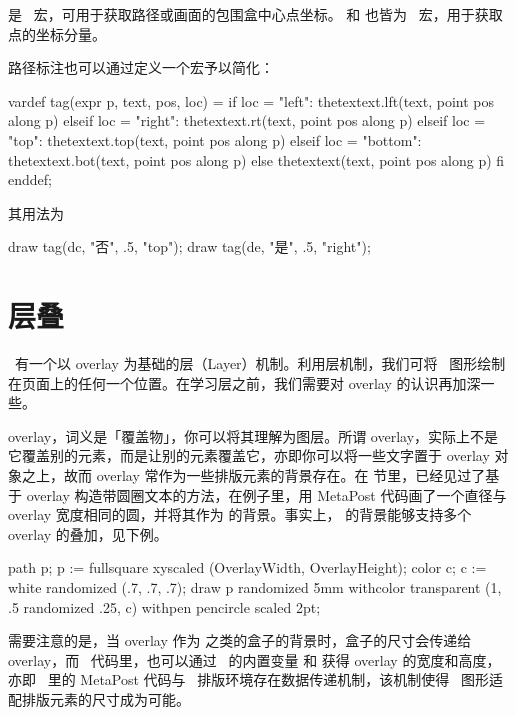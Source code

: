 \noindent {} 是 \METAPOST\ 宏，可用于获取路径或画面的包围盒中心点坐标。 和  也皆为 \METAPOST\ 宏，用于获取点的坐标分量。

路径标注也可以通过定义一个宏予以简化：

\starttyping[option=MP]
vardef tag(expr p, text, pos, loc) =
  if loc = "left": thetextext.lft(text, point pos along p)
  elseif loc = "right": thetextext.rt(text, point pos along p)
  elseif loc = "top": thetextext.top(text, point pos along p)
  elseif loc = "bottom": thetextext.bot(text, point pos along p)
  else thetextext(text, point pos along p)
  fi
enddef;
\stoptyping

\noindent 其用法为

\starttyping[option=MP]
draw tag(dc, "否", .5, "top"); draw tag(de, "是", .5, "right");
\stoptyping

\section{层叠}

\CONTEXT\ 有一个以 overlay 为基础的层（Layer）机制。利用层机制，我们可将 \METAPOST\ 图形绘制在页面上的任何一个位置。在学习层之前，我们需要对 overlay 的认识再加深一些。

overlay，词义是「覆盖物」，你可以将其理解为图层。所谓 overlay，实际上不是它覆盖别的元素，而是让别的元素覆盖它，亦即你可以将一些文字置于 overlay 对象之上，故而 overlay 常作为一些排版元素的背景存在。在 \in[framebg] 节里，已经见过了基于 overlay 构造带圆圈文本的方法，在例子里，用 MetaPost 代码画了一个直径与 overlay 宽度相同的圆，并将其作为  的背景。事实上，\type{\framed} 的背景能够支持多个 overlay 的叠加，见下例。

\startexample
{}
path p; p := fullsquare xyscaled (OverlayWidth, OverlayHeight);
color c; c := white randomized (.7, .7, .7);
draw p randomized 5mm
       withcolor transparent (1, .5 randomized .25, c)
       withpen pencircle scaled 2pt;
\stopuseMPgraphic
{}

\stopexample
\simpleexample[option=MP]{\getexample}

需要注意的是，当 overlay 作为  之类的盒子的背景时，盒子的尺寸会传递给 overlay，而 \METAPOST\ 代码里，也可以通过 \METAFUN\ 的内置变量  和  获得 overlay 的宽度和高度，亦即 \CONTEXT\ 里的 MetaPost 代码与 \CONTEXT\ 排版环境存在数据传递机制，该机制使得 \METAPOST\ 图形适配排版元素的尺寸成为可能。

